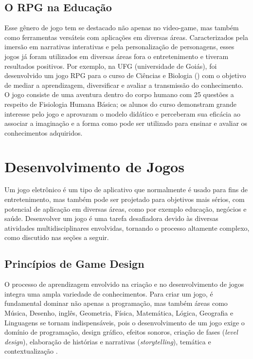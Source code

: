\subsection{O RPG na Educação}
\label{sec:rpg-na-educacao}
Esse gênero de jogo tem se destacado não apenas no video-game, mas também como ferramentas versáteis com aplicações em diversas áreas. Caracterizados pela imersão em narrativas interativas e pela personalização de personagens, esses jogos já foram utilizados em diversas áreas fora o entretenimento e tiveram resultados positivos. Por exemplo, na UFG (universidade de Goiás), foi desenvolvido um jogo RPG para o curso de Ciências e Biologia (\cite{soares2016role}) com o objetivo de mediar a aprendizagem, diversificar e avaliar a transmissão do conhecimento. O jogo consiste de uma aventura dentro do corpo humano com 25 questões a respeito de Fisiologia Humana Básica; os alunos do curso demonstram grande interesse pelo jogo e aprovaram o modelo didático e perceberam sua eficácia ao associar a imaginação e a forma como pode ser utilizado para ensinar e avaliar os conhecimentos adquiridos.


% 

\section{Desenvolvimento de Jogos}
\label{sec-desenvolvimento-de-jogos}
Um jogo eletrônico é um tipo de aplicativo que normalmente é usado para fins de entretenimento, mas também pode ser projetado para objetivos mais sérios, com potencial de aplicação em diversas áreas, como por exemplo educação, negócios e saúde. Desenvolver um jogo é uma tarefa desafiadora devido às diversas atividades multidisciplinares envolvidas, tornando o processo altamente complexo, como discutido nas seções a seguir. 

\subsection{Princípios de Game Design}
\label{sec:principios-de-game-design}
O processo de aprendizagem envolvido na criação e no desenvolvimento de jogos integra uma ampla variedade de conhecimentos. Para criar um jogo, é fundamental dominar não apenas a programação, mas também áreas como Música, Desenho, inglês, Geometria, Física, Matemática, Lógica, Geografia e Linguagens se tornam indispensáveis, pois o desenvolvimento de um jogo exige o domínio de programação, design gráfico, efeitos sonoros, criação de fases (\textit{level design}), elaboração de histórias e narrativas (\textit{storytelling}), temática e contextualização \cite{cestari2022aprendizagem}.

